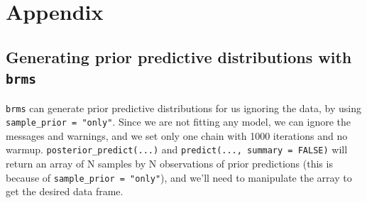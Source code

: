 \documentclass[12pt,]{krantz}
\theoremstyle{definition}
\theoremstyle{definition}
\theoremstyle{definition}
\theoremstyle{remark}
\begin{document}
\hypertarget{appendix}{%
\section{Appendix}\label{appendix}}

\hypertarget{generating-prior-predictive-distributions-with-brms}{%
\subsection{\texorpdfstring{Generating prior predictive distributions with \texttt{brms}}{Generating prior predictive distributions with brms}}\label{generating-prior-predictive-distributions-with-brms}}

\texttt{brms} can generate prior predictive distributions for us ignoring the data, by using \texttt{sample\_prior\ =\ "only"}. Since we are not fitting any model, we can ignore the messages and warnings, and we set only one chain with 1000 iterations and no warmup. \texttt{posterior\_predict(...)} and \texttt{predict(...,\ summary\ =\ FALSE)} will return an array of N samples by N observations of prior predictions (this is because of \texttt{sample\_prior\ =\ "only"}), and we'll need to manipulate the array to get the desired data frame.
\end{document}
